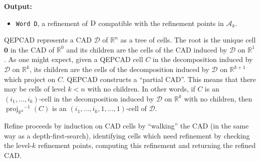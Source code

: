 \documentclass[
]{book}
\providecommand{\tightlist}{%
  \setlength{\itemsep}{0pt}\setlength{\parskip}{0pt}}
\theoremstyle{definition}
\theoremstyle{definition}
\theoremstyle{definition}
\theoremstyle{definition}
\theoremstyle{remark}
\begin{document}
\textbf{Output:}

\begin{itemize}
\tightlist
\item
  \texttt{Word\ D\textquotesingle{}}, a refinement of \(\rm{D}\) compatible with the refinement points in \(\mathcal{A}_k\).
\end{itemize}

QEPCAD represents a CAD \(\mathcal{D}\) of \(\mathbb{R}^n\) as a tree of cells. The root is the unique cell \(\mathbf{0}\) in the CAD of \(\mathbb{R}^0\) and its children are the cells of the CAD induced by \(\mathcal{D}\) on \(\mathbb{R}^1\). As one might expect, given a QEPCAD cell \(C\) in the decomposition induced by \(\mathcal{D}\) on \(\mathbb{R}^k\), its children are the cells of the decomposition induced by \(\mathcal{D}\) on \(\mathbb{R}^{k+1}\) which project on \(C\). QEPCAD constructs a ``partial CAD''. This means that there may be cells of level \(k < n\) with no children.
In other words, if \(C\) is an \((i_1,\ldots,i_k)\)-cell in the decomposition induced by \(\mathcal{D}\) on \(\mathbb{R}^k\) with no children, then \({\operatorname{proj}_{\mathbb{R}^{k}}}^{-1}(C)\) is an \((i_1,\ldots,i_k,1,\ldots,1)\)-cell of \(\mathcal{D}\).

Refine proceeds by induction on CAD cells by ``walking'' the CAD (in the same way as a depth-first-search), identifying cells which need refinement by checking the level-\(k\) refinement points, computing this refinement and returning the refined CAD.
\end{document}
